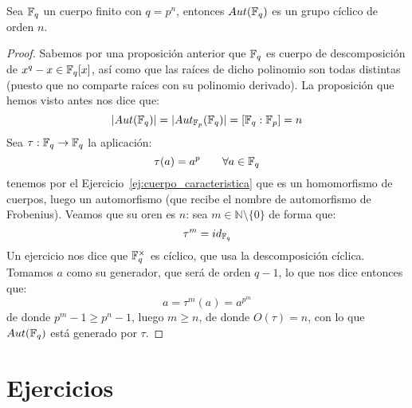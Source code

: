 \begin{teo}
    Sea $\mathbb{F}_q$ un cuerpo finito con $q=p^n$, entonces $Aut(\mathbb{F}_q)$ es un grupo cíclico de orden $n$.
    \begin{proof}
        Sabemos por una proposición anterior que $\mathbb{F}_q$ es cuerpo de descomposición de $x^q-x\in \mathbb{F}_q[x]$, así como que las raíces de dicho polinomio son todas distintas (puesto que no comparte raíces con su polinomio derivado). La proposición que hemos visto antes nos dice que:
        \begin{equation*}
            |Aut(\mathbb{F}_q)| = |Aut_{\mathbb{F}_p}(\mathbb{F}_q)| = [\mathbb{F}_q : \mathbb{F}_p] = n
        \end{equation*}
        Sea $\tau:\mathbb{F}_q\to \mathbb{F}_q$ la aplicación:
        \begin{equation*}
            \tau(a) = a^{p} \qquad \forall a\in \mathbb{F}_q
        \end{equation*}
        tenemos por el Ejercicio~\ref{ej:cuerpo_caracteristica} que es un homomorfismo de cuerpos, luego un automorfismo (que recibe el nombre de automorfismo de Frobenius). Veamos que su oren es $n$: sea $m\in \mathbb{N}\setminus \{0\}$ de forma que:
        \begin{equation*}
            \tau^m = id_{\mathbb{F}_q}
        \end{equation*}
        Un ejercicio nos dice que $\mathbb{F}_q^{\times}$ es cíclico, que usa la descomposición cíclica. Tomamos $a$ como su generador, que será de orden $q-1$, lo que nos dice entonces que:
        \begin{equation*}
            a = \tau^m (a)  = a^{p^m}
        \end{equation*}
        de donde $p^m -1\geq p^n -1$, luego $m\geq n$, de donde $O(\tau) = n$, con lo que $Aut(\mathbb{F}_q)$ está generado por $\tau$.
    \end{proof}
\end{teo}

\section{Ejercicios}



